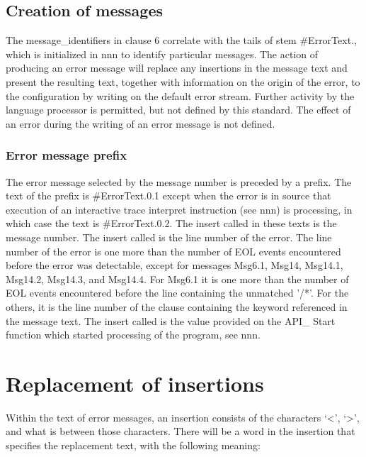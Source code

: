 \subsection{Creation of messages}\label{creation-of-messages}

The message\_identifiers in clause 6 correlate with the tails of stem
\#ErrorText., which is initialized in nnn to identify particular
messages. The action of producing an error message will replace any
insertions in the message text and present the resulting text, together
with information on the origin of the error, to the configuration by
writing on the default error stream. Further activity by the language
processor is permitted, but not defined by this standard. The effect of
an error during the writing of an error message is not defined.

\subsubsection{Error message prefix}\label{error-message-prefix}

The error message selected by the message number is preceded by a
prefix. The text of the prefix is \#ErrorText.0.1 except when the error
is in source that execution of an interactive trace interpret
instruction (see nnn) is processing, in which case the text is
\#ErrorText.0.2. The insert called in these texts is the message number.
The insert called is the line number of the error. The line number of
the error is one more than the number of EOL events encountered before
the error was detectable, except for messages Msg6.1, Msg14, Msg14.1,
Msg14.2, Msg14.3, and Msg14.4. For Msg6.1 it is one more than the number
of EOL events encountered before the line containing the unmatched '/*'.
For the others, it is the line number of the clause containing the
keyword referenced in the message text. The insert called is the value
provided on the API\_ Start function which started processing of the
program, see nnn.

\section{Replacement of insertions}\label{replacement-of-insertions}

Within the text of error messages, an insertion consists of the
characters `\textless{}', `\textgreater{}', and what is between those
characters. There will be a word in the insertion that specifies the
replacement text, with the following meaning:

